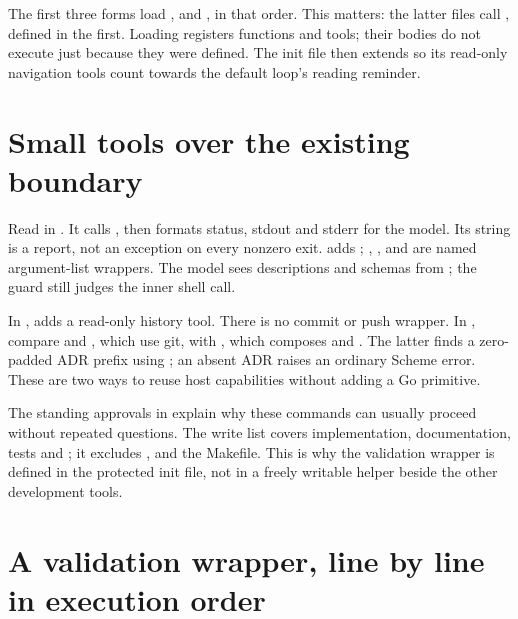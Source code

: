 The first three forms load ,  and
, in that order. This matters: the latter files call
, defined in the first. Loading registers functions and tools;
their bodies do not execute just because they were defined. The init file
then extends  so its read-only navigation tools count
towards the default loop's reading reminder.

\section{Small tools over the existing boundary}

Read  in . It calls , then
formats status, stdout and stderr for the model. Its string is a report,
not an exception on every nonzero exit.  adds ;
, ,  and 
are named argument-list wrappers. The model sees descriptions and schemas
from ; the guard still judges the inner shell call.

In ,  adds a read-only history tool.
There is no commit or push wrapper. In , compare
 and , which use git, with
, which composes  and .
The latter finds a zero-padded ADR prefix using ; an absent ADR
raises an ordinary Scheme error. These are two ways to reuse host
capabilities without adding a Go primitive.

The standing approvals in  explain why these
commands can usually proceed without repeated questions. The write list
covers implementation, documentation, tests and ; it excludes
,  and the Makefile. This is why the validation
wrapper is defined in the protected init file, not in a freely writable
helper beside the other development tools.

\section{A validation wrapper, line by line in execution order}

